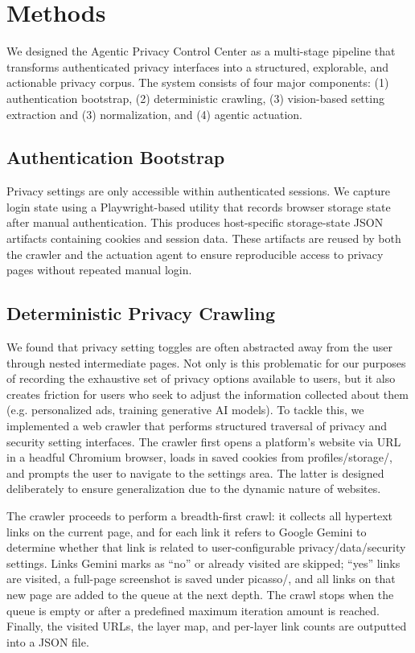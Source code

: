 \documentclass[12pt,letterpaper]{article}
\begin{document}
\section{Methods }
    
    We designed the Agentic Privacy Control Center as a multi-stage pipeline that transforms authenticated privacy interfaces into a structured, explorable, and actionable privacy corpus. The system consists of four major components: (1) authentication bootstrap, (2) deterministic crawling, (3) vision-based setting extraction and (3) normalization, and (4) agentic actuation.
    
    \subsection{Authentication Bootstrap}
    
    Privacy settings are only accessible within authenticated sessions. We capture login state using a Playwright-based utility that records browser storage state after manual authentication. This produces host-specific storage-state JSON artifacts containing cookies and session data. These artifacts are reused by both the crawler and the actuation agent to ensure reproducible access to privacy pages without repeated manual login.
    
    \subsection{Deterministic Privacy Crawling}

    We found that privacy setting toggles are often abstracted away from the user through nested intermediate pages. Not only is this problematic for our purposes of recording the exhaustive set of privacy options available to users, but it also creates friction for users who seek to adjust the information collected about them (e.g. personalized ads, training generative AI models). To tackle this, we implemented a web crawler that performs structured traversal of privacy and security setting interfaces. The crawler first opens a platform's website via URL in a headful Chromium browser, loads in saved cookies from profiles/storage/, and prompts the user to navigate to the settings area. The latter is designed deliberately to ensure generalization due to the dynamic nature of websites.

    The crawler proceeds to perform a breadth-first crawl: it collects all hypertext links on the current page, and for each link it refers to Google Gemini to determine whether that link is related to user-configurable privacy/data/security settings. Links Gemini marks as “no” or already visited are skipped; “yes” links are visited, a full-page screenshot is saved under picasso/, and all links on that new page are added to the queue at the next depth. The crawl stops when the queue is empty or after a predefined maximum iteration amount is reached. Finally, the visited URLs, the layer map, and per-layer link counts are outputted into a JSON file.
\end{document}
